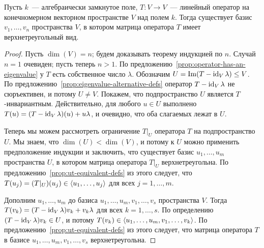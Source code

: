 \begin{theorem}
Пусть $k$~--- алгебраически замкнутое поле, $T\colon V\to V$~---
линейный оператор на конечномерном
векторном пространстве $V$ над полем $k$.
Тогда существует базис $v_1,\dots,v_n$ пространства $V$,
в котором матрица оператора $T$ имеет верхнетреугольный вид.
\end{theorem}
\begin{proof}
Пусть $\dim(V) = n$; будем доказывать теорему индукцией по $n$.
Случай $n=1$ очевиден; пусть теперь $n>1$. По
предложению~\ref{prop:operator-has-an-eigenvalue} у $T$ есть собственное
число $\lambda$. Обозначим $U = \operatorname{Im}(T-\operatorname{id}_V\lambda)\leq V$.
По предложению~\ref{prop:eigenvalue-alternative-defs} оператор
$T-\operatorname{id}_V\lambda$ не сюръективен, и потому $U\neq V$.
Покажем, что подпространство $U$ является $T$-инвариантным.
Действительно, для любого $u\in U$ выполнено
$T(u) = (T-\operatorname{id}_V\lambda)(u) + u\lambda$, и очевидно, что оба слагаемых
лежат в $U$.

Теперь мы можем рассмотреть ограничение $T|_U$ оператора $T$ на
подпространство $U$. Мы знаем, что $\dim(U) < \dim(V)$, и потому
к $U$ можно применить предположение индукции и заключить, что
существует базис $u_1,\dots,u_m$ пространства $U$, в котором
матрица оператора $T|_U$ верхнетреугольна. По
предложению~\ref{prop:ut-equivalent-defs} из этого следует, что
$T(u_j) = (T|_U)(u_j) \in\langle u_1,\dots,u_j\rangle$ для всех $j=1,\dots,m$.

Дополним $u_1,\dots,u_m$ до базиса $u_1,\dots,u_m,v_1,\dots,v_s$
пространства $V$. Тогда
$T(v_k) = (T-\operatorname{id}_V\lambda)v_k + v_k\lambda$ для всех $k=1,\dots,s$.
По определению $(T-\operatorname{id}_V\lambda)v_k\in U$, и потому
$T(v_k)\in\langle u_1,\dots,u_m,v_1,\dots,v_k\rangle$.
По предложению~\ref{prop:ut-equivalent-defs} из этого следует,
что матрица оператора $T$ в базисе
$u_1,\dots,u_m,v_1,\dots,v_s$ верхнетреугольна.
\end{proof}


